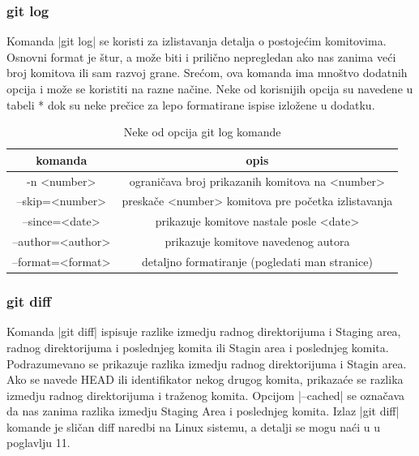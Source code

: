 \documentclass[a4paper]{article}
\begin{document}
{\subsubsection*{git log}
\label{log}
Komanda |git log| se koristi za izlistavanja detalja o postojećim komitovima. Osnovni format je štur, a može biti i prilično nepregledan ako nas zanima veći broj komitova ili sam razvoj grane. Srećom, ova komanda ima mnoštvo dodatnih opcija i može se koristiti na razne načine. Neke od korisnijih opcija su navedene u tabeli * dok su neke prečice za lepo formatirane ispise izložene u dodatku. 

\begin{table}[h!]
\begin{center}


\begin{tabular}{cc} \hline
komanda & opis\\ \hline
-n <number> & ograničava broj prikazanih komitova na <number> \\
--skip=<number> & preskače <number> komitova pre početka izlistavanja \\
--since=<date> & prikazuje komitove nastale posle <date> \\
--author=<author> & prikazuje komitove navedenog autora \\
--format=<format> & detaljno formatiranje (pogledati man stranice)
\end{tabular}
\caption{Neke od opcija git log komande}
\end{center}
\label{tab:tabela1}

\end{table}


\subsubsection*{git diff}
\label{subsec:git_diff}
Komanda |git diff| ispisuje razlike izmedju radnog direktorijuma i Staging area, radnog direktorijuma i poslednjeg komita ili Stagin area i poslednjeg komita. \\
Podrazumevano se prikazuje razlika izmedju radnog direktorijuma i Stagin area. Ako se navede HEAD ili identifikator nekog drugog komita, prikazaće se razlika izmedju radnog direktorijuma i traženog komita. Opcijom |--cached| se označava da nas zanima razlika izmedju Staging Area i poslednjeg komita.
Izlaz |git diff| komande je sličan diff naredbi na Linux sistemu, a detalji se mogu naći u \cite{pocketguide} u poglavlju 11.


}
\end{document}
